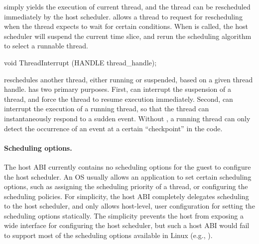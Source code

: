  simply yields the execution of current thread, and the thread can be rescheduled immediately by the host scheduler.
 allows a thread to request for rescheduling when the thread expects
to wait for certain conditions.
When  is called, the host scheduler will suspend the current time slice,
and rerun the scheduling algorithm to select a runnable thread.








\begin{paldef}
void ThreadInterrupt (HANDLE thread_handle);
\end{paldef}



 reschedules another thread, either running or suspended, based on a given thread handle.
 has two primary purposes.
First,  can interrupt the suspension of a thread, and force the thread to resume execution immediately.
Second,  can interrupt the execution of a running thread,
so that the thread can instantaneously respond to a sudden event.
Without ,
a running thread can only detect the occurrence of an event at a certain ``checkpoint'' in the code.





\paragraph{Scheduling options.}
The host ABI currently contains no scheduling options for the guest to configure the host scheduler.
An OS usually allows an application to set certain scheduling options,
such as assigning the scheduling priority of a thread, or configuring the scheduling policies.
For simplicity,
the host ABI completely delegates scheduling to the host scheduler,
and only allows host-level, user configuration for setting the scheduling options statically.
The simplicity prevents the host from exposing a wide interface
for configuring the host scheduler,
but such a host ABI would fail to support
most of the scheduling options available in Linux (e.g., ).



